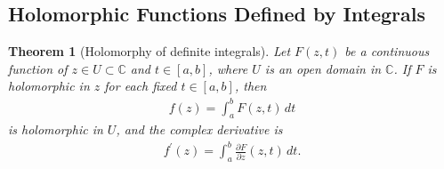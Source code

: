 \documentclass{article}
\numberwithin{equation}{section}
\newcommand{\bbC}{\mathbb{C}}
\theoremstyle{plain}
\newtheorem{theorem}{Theorem}[section]
\theoremstyle{definition}
\begin{document}
\subsection{Holomorphic Functions Defined by Integrals}
\begin{theorem}[Holomorphy of definite integrals]
Let $F(z,t)$ be a continuous function of $z\in U\subset\bbC$ and $t\in[a,b]$, where $U$ is an open domain in $\bbC$. If $F$ is holomorphic in $z$ for each fixed $t\in[a,b]$, then
\begin{align*}
	f(z)=\int_a^b F(z,t)\,dt
\end{align*}
is holomorphic in $U$, and the complex derivative is
\begin{align*}
	f^\prime(z)=\int_a^b\frac{\partial F}{\partial z}(z,t)\,dt.
\end{align*}
\end{theorem}
\end{document}
